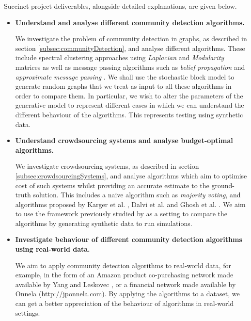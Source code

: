 \documentclass[12pt]{article}
\numberwithin{equation}{section}
\begin{document}
Succinct project deliverables, alongside detailed explanations, are given below.
\begin{itemize}
	\item \textbf{Understand and analyse different community detection algorithms.}

	We investigate the problem of community detection in graphs, as described in section \ref{subsec:communityDetection}, and analyse different algorithms. These include spectral clustering approaches using \textit{Laplacian} \cite{Spi07,Spi12} and \textit{Modularity} \cite{New06a,New06b} matrices as well as message passing algorithms such as \textit{belief propagation} \cite{DKM+13} and \textit{approximate message passing} \cite{BM11}. We shall use the stochastic block model to generate random graphs that we treat as input to all these algorithms in order to compare them. In particular, we wish to alter the parameters of the generative model to represent different cases in which we can understand the different behaviour of the algorithms. This represents testing using synthetic data.

	\item \textbf{Understand crowdsourcing systems and analyse budget-optimal algorithms.}

	We investigate crowdsourcing systems, as described in section \ref{subsec:crowdsourcingSystems}, and analyse algorithms which aim to optimise cost of such systems whilst providing an accurate estimate to the ground-truth solution. This includes a naive algorithm such as \textit{majority voting}, and algorithms proposed by Karger et al. \cite{KOS13}, Dalvi et al. \cite{DDK+13} and Ghosh et al. \cite{GKM11}. We aim to use the framework previously studied by \cite{KOS13,DDK+13} as a setting to compare the algorithms by generating synthetic data to run simulations.

	\item \textbf{Investigate behaviour of different community detection algorithms using real-world data.}

	We aim to apply community detection algorithms to real-world data, for example, in the form of an Amazon product co-purchasing network made available by Yang and Leskovec \cite{YL12}, or a financial network made available by Onnela (\url{http://jponnela.com}). By applying the algorithms to a dataset, we can get a better appreciation of the behaviour of algorithms in real-world settings.
\end{itemize}

\end{document}
